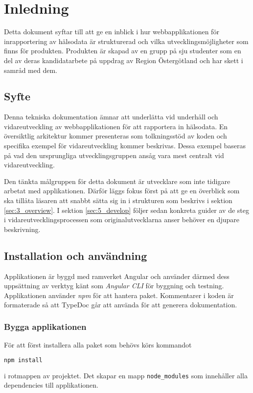 \documentclass[techdoc/techdoc.tex]{subfiles}
\begin{document}
\section{Inledning} \label{sec:1_intro}
Detta dokument syftar till att ge en inblick i hur webbapplikationen för
inrapportering av hälsodata är strukturerad och vilka utvecklingsmöjligheter
som finns för produkten. Produkten är skapad av en grupp på sju studenter som
en del av deras kandidatarbete på uppdrag av Region Östergötland och har skett
i samråd med dem.


\subsection{Syfte}
Denna tekniska dokumentation ämnar att underlätta vid underhåll och
vidareutveckling av webbapplikationen för att rapportera in hälsodata. En
översiktlig arkitektur kommer presenteras som tolkningsstöd av koden och
specifika exempel för vidareutveckling kommer beskrivas. Dessa exempel baseras
på vad den ursprungliga utvecklingsgruppen ansåg vara mest centralt vid
vidareutveckling.

Den tänkta målgruppen för detta dokument är utvecklare som inte tidigare
arbetat med applikationen. Därför läggs fokus först på att ge en överblick som
ska tillåta läsaren att snabbt sätta sig in i strukturen som beskrivs i sektion
\ref{sec:3_overview}. I sektion \ref{sec:5_develop} följer sedan konkreta
guider av de steg i vidareutvecklingsprocessen som originalutvecklarna anser
behöver en djupare beskrivning.

\subsection{Installation och användning}
Applikationen är byggd med ramverket Angular och använder därmed dess
uppsättning av verktyg känt som \emph{Angular CLI} för byggning och testning.
Applikationen använder \emph{npm} för att hantera paket.  Kommentarer i koden
är formaterade så att TypeDoc går att använda för att generera dokumentation.

\subsubsection{Bygga applikationen}
För att först installera alla paket som behövs körs kommandot
\begin{lstlisting}[language=sh]
    npm install
\end{lstlisting}
i rotmappen av projektet. Det skapar en mapp \texttt{node\_modules} som
innehåller alla dependencies till applikationen.
\end{document}
